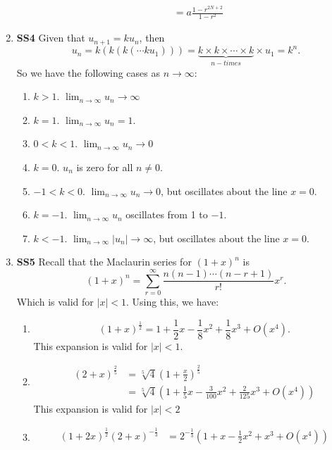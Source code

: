 \documentclass[12pt,oneside]{book}
\begin{document}
\begin{enumerate}
\begin{enumerate}
\begin{align*}
                &= a \frac{1-r^{2N+2}}{1-r^2}
            \end{align*}
        \end{enumerate}
        \item \textbf{SS4} Given that $u_{n + 1} = k u_n$, then \[
            u_n = k ( k ( k ( \cdots k u_1))) = \underbrace{k \times k \times \cdots \times k}_{n-times} \times u_1 = k^n
        .\]  So we have the following cases as $n \to \infty$: \begin{enumerate}
            \item $k > 1$. $\lim_{n \to \infty} u_n \to \infty$
            \item $k = 1$. $\lim_{n \to \infty} u_n = 1$.
            \item $0 < k < 1$. $\lim_{n \to \infty} u_n \to 0$
            \item $k = 0$. $u_n$ is zero for all $n \neq 0$.
            \item $-1 < k < 0$. $\lim_{n \to \infty} u_n \to 0$, but oscillates about the line $x = 0$.
            \item $k = -1$. $\lim_{n \to \infty} u_n$ oscillates from 1 to $-1$.
            \item $k < -1$. $\lim_{n \to \infty} |u_n| \to \infty$, but oscillates about the line $x = 0$.
        \end{enumerate}
        \item \textbf{SS5} Recall that the Maclaurin series for $(1+x)^n$ is \[
            (1+x)^n = \sum_{r = 0}^ \infty \frac{n(n-1) \cdots (n-r+1)}{r!} x^r
        .\] Which is valid for $|x| < 1$. Using this, we have: \begin{enumerate}
            \item \[
                (1+x)^{\frac{1}{2}} = 1 + \frac{1}{2}x - \frac{1}{8}x^2 + \frac{1}{8}x^3 + O(x^4)
            .\]  This expansion is valid for $|x| < 1$.
            \item \begin{align*}
                (2 + x)^{\frac{2}{5}} &= \sqrt[5]{4} \left( 1 + \frac{x}{2} \right) ^{\frac{2}{5}} \\
                &= \sqrt[5]{4} \left( 1 + \frac{1}{5}x - \frac{3}{100}x^2 + \frac{2}{125}x^3 + O(x^4) \right)
            \end{align*} This expansion is valid for $|x| < 2$
            \item \begin{align*}
                (1+2x)^{\frac{1}{2}} (2+x)^{-\frac{1}{3}} &= 2^{-\frac{1}{3}} \left( 1 + x - \frac{1}{2}x^2 + x^3 + O(x^4) \right) \\ 

\end{align*}
\end{enumerate}
\end{enumerate}
\end{document}
